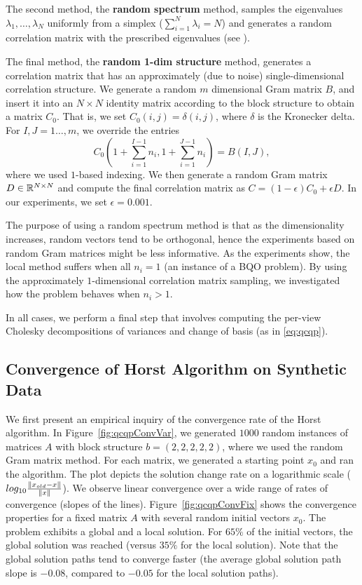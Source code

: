 The second method, the \textbf{random spectrum} method,
samples the eigenvalues $\lambda_1,\ldots,\lambda_N$ uniformly
from a simplex ($\sum_{i=1}^{N} \lambda_i = N$) and generates a
random correlation matrix with the prescribed eigenvalues (see
\cite{Bendel_Mickey_78}).

The final method, the \textbf{random 1-dim structure} method,
generates a correlation matrix that has an approximately (due to
noise) single-dimensional correlation structure. We
generate a random $m$ dimensional Gram matrix $B$, and insert
it into an $N\times N$ identity matrix according to the block
structure to obtain a matrix $C_0$. That is, we set $C_0\left(i,j\right) = \delta\left(i,j\right)$,
where $\delta$ is the Kronecker delta. For $I,J = 1\ldots,m$, we
override the entries $$C_0\left(1+ \sum_{i=1}^{I-1}n_i, 1+
\sum_{i=1}^{J-1}n_i\right) = B\left(I,J\right),$$ where we used $1$-based
indexing. We then generate a random Gram matrix $D \in
\mathbb{R}^{N\times N}$ and compute the final correlation matrix as $C
= \left(1- \epsilon\right)C_0 + \epsilon D$.
In our experiments, we set $\epsilon = 0.001$.

The purpose of using a random spectrum method
is that as the dimensionality increases, random vectors tend to
be orthogonal, hence the experiments based on random Gram
matrices might be less informative. As the experiments show, the
local method suffers  when all $n_i = 1$ (an instance of a BQO problem).
By using the approximately $1$-dimensional correlation matrix sampling,
we investigated how the problem behaves when $n_i > 1$.

In all cases, we perform a final step that involves computing the
per-view Cholesky decompositions of variances and change of basis
(as in \ref{eq:qcqp}).

\subsection{Convergence of Horst Algorithm on Synthetic Data}\label{chap:experiments:horst}

We first present an empirical inquiry of the convergence rate of the
Horst algorithm. In Figure~\ref{fig:qcqpConvVar}, we
generated $1000$ random  instances of matrices $A$ with block
structure $b = \left(2,2,2,2,2\right)$, where we used
the random Gram matrix method. For each matrix, we generated
a starting point $x_0$ and ran the algorithm. The plot depicts the
solution change rate on a logarithmic scale ($log_{10}
\frac{\lVert x_{old} - x\rVert}{\lVert x\rVert}$). We observe linear convergence
over a wide range of rates of convergence (slopes of the
lines). Figure~\ref{fig:qcqpConvFix} shows the convergence properties
for a fixed matrix $A$ with several random initial vectors $x_0$. The
problem exhibits a global and a local solution. For $65\%$ of the initial vectors,
the global solution was reached (versus $35\%$ for the local solution). Note that the global
solution paths tend to converge faster (the average global solution path slope
is  $-0.08$, compared  to $-0.05$ for the local solution paths).

